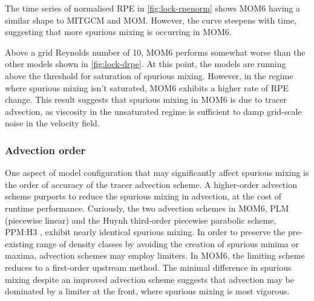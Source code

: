 The time series of normalised RPE in \cref{fig:lock-rpenorm} shows MOM6 having a similar shape to MITGCM and MOM. However, the curve steepens with time, suggesting that more spurious mixing is occurring in MOM6.


Above a grid Reynolds number of 10, MOM6 performs somewhat worse than the other models shown in \cref{fig:lock-drpe}. At this point, the models are running above the threshold for saturation of spurious mixing. However, in the regime where spurious mixing isn't saturated, MOM6 exhibits a higher rate of RPE change. This result suggests that spurious mixing in MOM6 is due to tracer advection, as viscosity in the unsaturated regime is sufficient to damp grid-scale noise in the velocity field.


\subsubsection{Advection order}
One aspect of model configuration that may significantly affect spurious mixing is the order of accuracy of the tracer advection scheme. A higher-order advection scheme purports to reduce the spurious mixing in advection, at the cost of runtime performance. Curiously, the two advection schemes in MOM6, PLM (piecewise linear) and the Huynh third-order piecewise parabolic scheme, PPM:H3 \citep{huynh97}, exhibit nearly identical spurious mixing. In order to preserve the pre-existing range of density classes by avoiding the creation of spurious minima or maxima, advection schemes may employ limiters. In MOM6, the limiting scheme reduces to a first-order upstream method. The minimal difference in spurious mixing despite an improved advection scheme suggests that advection may be dominated by a limiter at the front, where spurious mixing is most vigorous.


